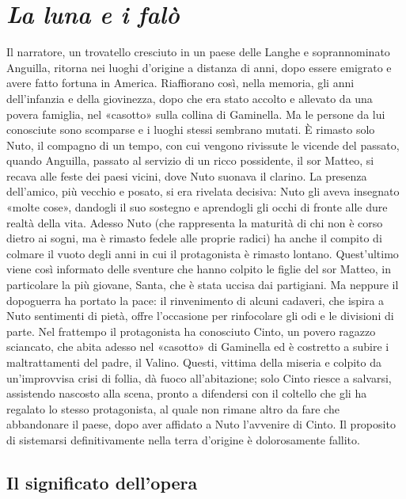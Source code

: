 \section{\textit{La luna e i falò}}

Il narratore, un trovatello cresciuto in un paese delle Langhe e soprannominato Anguilla, ritorna nei luoghi d'origine a distanza di anni, dopo essere emigrato e avere fatto fortuna in America. Riaffiorano così, nella memoria, gli anni dell'infanzia e della giovinezza, dopo che era stato accolto e allevato da una povera famiglia, nel «casotto» sulla collina di Gaminella. Ma le persone da lui conosciute sono scomparse e i luoghi stessi sembrano mutati. È rimasto solo Nuto, il compagno di un tempo, con cui vengono rivissute le vicende del passato, quando Anguilla, passato al servizio di un ricco possidente, il sor Matteo, si recava alle feste dei paesi vicini, dove Nuto suonava il clarino. La presenza dell'amico, più vecchio e posato, si era rivelata decisiva: Nuto gli aveva insegnato «molte cose», dandogli il suo sostegno e aprendogli gli occhi di fronte alle dure realtà della vita. Adesso Nuto (che rappresenta la maturità di chi non è corso dietro ai sogni, ma è rimasto fedele alle proprie radici) ha anche il compito di colmare il vuoto degli anni in cui il protagonista è rimasto lontano. Quest'ultimo viene così informato delle sventure che hanno colpito le figlie del sor Matteo, in particolare la più giovane, Santa, che è stata uccisa dai partigiani. Ma neppure il dopoguerra ha portato la pace: il rinvenimento di alcuni cadaveri, che ispira a Nuto sentimenti di pietà, offre l'occasione per rinfocolare gli odi e le divisioni di parte. Nel frattempo il protagonista ha conosciuto Cinto, un povero ragazzo sciancato, che abita adesso nel «casotto» di Gaminella ed è costretto a subire i maltrattamenti del padre, il Valino. Questi, vittima della miseria e colpito da un'improvvisa crisi di follia, dà fuoco all'abitazione; solo Cinto riesce a salvarsi, assistendo nascosto alla scena, pronto a difendersi con il coltello che gli ha regalato lo stesso protagonista, al quale non rimane altro da fare che abbandonare il paese, dopo aver affidato a Nuto l'avvenire di Cinto. Il proposito di sistemarsi definitivamente nella terra d'origine è dolorosamente fallito.

\subsection{Il significato dell'opera}


